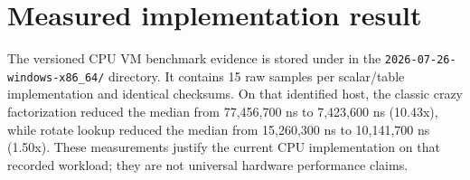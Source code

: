 \documentclass{article}
\begin{document}
\section{Measured implementation result}

The versioned CPU VM benchmark evidence is stored under
 in the
\texttt{2026{-}07{-}26{-}windows{-}x86\_64/} directory. It contains 15 raw
samples per scalar/table implementation and identical checksums. On that
identified host, the classic crazy factorization reduced the median from
77,456,700 ns to 7,423,600 ns (10.43x), while rotate lookup reduced the median
from 15,260,300 ns to 10,141,700 ns (1.50x). These measurements justify the
current CPU implementation on that recorded workload; they are not universal
hardware performance claims.
\end{document}

